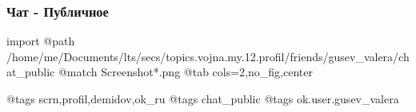  
 
 
 
 

\subsubsection{Чат - Публичное}

\ifcmt
  import
  @path /home/me/Documents/lts/secs/topics.vojna.my.12.profil/friends/gusev_valera/chat_public
  @match Screenshot*.png
  @tab cols=2,no_fig,center

  @tags scrn,profil,demidov,ok_ru
  @tags chat_public
  @tags ok.user.gusev_valera

\fi
